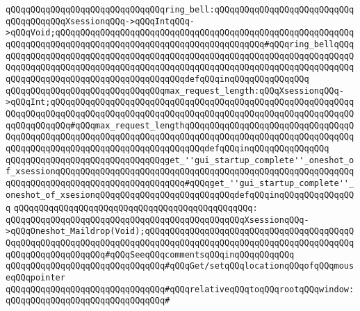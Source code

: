\verb|qQQqqQQqqQQqqQQqqQQqqQQqqQQqqQQqring_bell:qQQqqQQqqQQqqQQqqQQqqQQqqQQqqQQqqQQqqQQqXsessionqQQq->qQQqIntqQQq->qQQqVoid;qQQqqQQqqQQqqQQqqQQqqQQqqQQqqQQqqQQqqQQqqQQqqQQqqQQqqQQqqQQqqQQqqQQqqQQqqQQqqQQqqQQqqQQqqQQqqQQqqQQqqQQqqQQqqQQq#qQQqring_bellqQQqqQQqqQQqqQQqqQQqqQQqqQQqqQQqqQQqqQQqqQQqqQQqqQQqqQQqqQQqqQQqqQQqqQQqqQQqqQQqqQQqqQQqqQQqqQQqqQQqqQQqqQQqqQQqqQQqqQQqqQQqqQQqqQQqqQQqqQQqqQQqqQQqqQQqqQQqqQQqqQQqqQQqqQQqqQQqqQQqdefqQQqinqQQqqQQqqQQqqQQq|\newline
\verb|qQQqqQQqqQQqqQQqqQQqqQQqqQQqqQQqmax_request_length:qQQqXsessionqQQq->qQQqInt;qQQqqQQqqQQqqQQqqQQqqQQqqQQqqQQqqQQqqQQqqQQqqQQqqQQqqQQqqQQqqQQqqQQqqQQqqQQqqQQqqQQqqQQqqQQqqQQqqQQqqQQqqQQqqQQqqQQqqQQqqQQqqQQqqQQqqQQqqQQqqQQq#qQQqmax_request_lengthqQQqqQQqqQQqqQQqqQQqqQQqqQQqqQQqqQQqqQQqqQQqqQQqqQQqqQQqqQQqqQQqqQQqqQQqqQQqqQQqqQQqqQQqqQQqqQQqqQQqqQQqqQQqqQQqqQQqqQQqqQQqqQQqqQQqqQQqqQQqqQQqdefqQQqinqQQqqQQqqQQqqQQq|\newline
\verb|qQQqqQQqqQQqqQQqqQQqqQQqqQQqqQQqget_''gui_startup_complete''_oneshot_of_xsessionqQQqqQQqqQQqqQQqqQQqqQQqqQQqqQQqqQQqqQQqqQQqqQQqqQQqqQQqqQQqqQQqqQQqqQQqqQQqqQQqqQQqqQQqqQQqqQQq#qQQqget_''gui_startup_complete''_oneshot_of_xsesionqQQqqQQqqQQqqQQqqQQqqQQqqQQqdefqQQqinqQQqqQQqqQQqqQQq|\newline
\verb|qQQqqQQqqQQqqQQqqQQqqQQqqQQqqQQqqQQqqQQqqQQqqQQq:|\newline
\verb|qQQqqQQqqQQqqQQqqQQqqQQqqQQqqQQqqQQqqQQqqQQqqQQqXsessionqQQq->qQQqOneshot_Maildrop(Void);qQQqqQQqqQQqqQQqqQQqqQQqqQQqqQQqqQQqqQQqqQQqqQQqqQQqqQQqqQQqqQQqqQQqqQQqqQQqqQQqqQQqqQQqqQQqqQQqqQQqqQQqqQQqqQQqqQQqqQQqqQQqqQQqqQQq#qQQqSeeqQQqcommentsqQQqinqQQqqQQqqQQq|\newline
\newline
\verb|qQQqqQQqqQQqqQQqqQQqqQQqqQQqqQQq#qQQqGet/setqQQqlocationqQQqofqQQqmouseqQQqpointer|\newline
\verb|qQQqqQQqqQQqqQQqqQQqqQQqqQQqqQQq#qQQqrelativeqQQqtoqQQqrootqQQqwindow:|\newline
\verb|qQQqqQQqqQQqqQQqqQQqqQQqqQQqqQQq#|\newline
